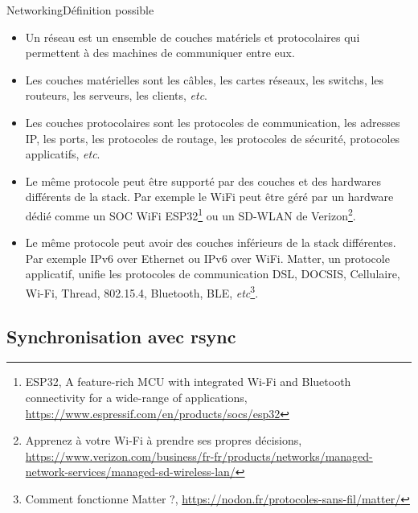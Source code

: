 \documentclass{beamer}
\begin{document}
    \begin{frame}{Networking}{Définition possible}
        \begin{scriptsize}
            \begin{itemize}
                \item Un réseau est un ensemble de couches matériels et protocolaires qui permettent à des machines de communiquer entre eux.
                \item Les couches matérielles sont les câbles, les cartes réseaux, les switchs, les routeurs, les serveurs, les clients, \textit{etc}.
                \item Les couches protocolaires sont les protocoles de communication, les adresses IP, les ports, les protocoles de routage, les protocoles de sécurité, protocoles applicatifs, \textit{etc}.
                \item Le même protocole peut être supporté par des couches et des hardwares différents de la stack.
                Par exemple le WiFi peut être géré par un hardware dédié comme un SOC WiFi ESP32\footnote{ESP32, A feature-rich MCU with integrated Wi-Fi and Bluetooth connectivity for a wide-range of applications, \url{https://www.espressif.com/en/products/socs/esp32}} ou un SD-WLAN de Verizon\footnote{Apprenez à votre Wi-Fi à prendre ses propres décisions, \url{https://www.verizon.com/business/fr-fr/products/networks/managed-network-services/managed-sd-wireless-lan/}}.
                \item Le même protocole peut avoir des couches inférieurs de la stack différentes.
                Par exemple IPv6 over Ethernet ou IPv6 over WiFi.
                Matter, un protocole applicatif, unifie les protocoles de communication DSL, DOCSIS, Cellulaire, Wi-Fi, Thread, 802.15.4, Bluetooth, BLE, \textit{etc}\footnote{Comment fonctionne Matter ?, \url{https://nodon.fr/protocoles-sans-fil/matter/}}.
            \end{itemize}
        \end{scriptsize}
    \end{frame}

    \subsection{Synchronisation avec rsync}\label{subsec:rsync-syncro}
\end{document}
